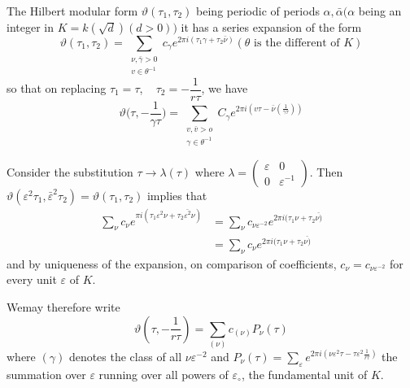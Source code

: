 The Hilbert modular form $\vartheta(\tau_1, \tau_2)$ being periodic of
periods $\alpha, \bar{\alpha}(\alpha $ being an integer in $K =
k(\sqrt{d}) (d > 0))$ it has a series expansion of the form  
$$
\vartheta (\tau_1, \tau_2) = \sum_{\substack{ \nu, \bar{\gamma}> 0
    \\ v \in \theta^{-1}}} c_\gamma e^{2 \pi i (\tau_1 \gamma + \tau_2
  \bar{\nu})}(\theta \text{ is the different of } K) 
$$
so that on replacing $\tau_1 = \tau$, ~ $\tau_2 = -\dfrac{1}{r \tau}$,
we have 
$$
\vartheta \bigg(\tau, - \frac{1}{\gamma \tau}\bigg) = \sum
_{\substack{v, \bar{v} > o \\ { \gamma \in \theta^{-1}}}} C_\gamma
e^{2 \pi i(v \tau - \bar{\nu}(\frac{1}{\gamma \tau}))} 
$$

Consider the substitution $\tau \to \lambda (\tau)$ where $\lambda
= \begin{pmatrix} \varepsilon & 0 \\ 0 &
  \varepsilon^{-1} \end{pmatrix}$. Then $\vartheta(\varepsilon^2
\tau_1, \bar{\varepsilon}^2 \tau_2)= \vartheta(\tau_1, \tau_2)$
implies that 
\begin{align*}
  \sum_\nu c_\nu e^{\pi i (\tau_1 \varepsilon^2 \nu + \tau_2
    \bar{\varepsilon^2} \nu)} & = \sum_\nu c_{\nu \varepsilon^{-2}} e^{2
    \pi i (\tau_1 \nu  + \tau_2 \bar{\nu)}}  \\ 
  & = \sum_\nu c_\nu  e^{2 \pi i (\tau_1 \nu  + \tau_2 \bar{\nu)}}
\end{align*}
and by uniqueness of the expansion, on comparison of coefficients,
$c_\nu = c_{\nu \varepsilon^{-2}}$ for every unit $\varepsilon$ of
$K$. 

We\pageoriginale may therefore write
$$
\vartheta\left(\tau, - \frac{1}{r \tau}\right) = \sum_{(\nu)}c_{(\nu)}P_\nu (\tau)
$$
where $(\gamma)$ denotes the class of all $\nu \varepsilon^{-2}$ and
$P_\nu (\tau) = \sum \limits_{\varepsilon} e^{2 \pi i \left( \nu
  \varepsilon^2 \tau - \tau \varepsilon^2 \frac{1}{r \tau}\right)}$
the summation over 
$\varepsilon$ running over all powers of $\varepsilon_\circ$, the
fundamental unit of $K$. 

